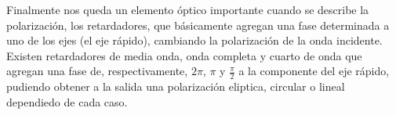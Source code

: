 \documentclass[a4paper,spanish]{article}
\numberwithin{equation}{section}
\begin{document}
	Finalmente nos queda un elemento \'optico importante cuando se describe la polarizaci\'on, los retardadores, que b\'asicamente agregan una fase determinada a uno de los ejes (el eje r\'apido), cambiando la polarizaci\'on de la onda incidente. Existen retardadores de media onda, onda completa y cuarto de onda que agregan una fase de, respectivamente, $2\pi$, $\pi$ y $\frac{\pi}{2}$ a la componente del eje r\'apido, pudiendo obtener a la salida una polarizaci\'on eliptica, circular o lineal dependiedo de cada caso.
	
\end{document}
